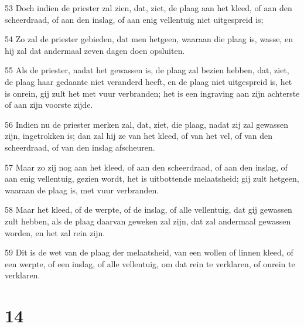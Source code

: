 \par 53 Doch indien de priester zal zien, dat, ziet, de plaag aan het kleed, of aan den scheerdraad, of aan den inslag, of aan enig vellentuig niet uitgespreid is;
\par 54 Zo zal de priester gebieden, dat men hetgeen, waaraan die plaag is, wasse, en hij zal dat andermaal zeven dagen doen opsluiten.
\par 55 Als de priester, nadat het gewassen is, de plaag zal bezien hebben, dat, ziet, de plaag haar gedaante niet veranderd heeft, en de plaag niet uitgespreid is, het is onrein, gij zult het met vuur verbranden; het is een ingraving aan zijn achterste of aan zijn voorste zijde.
\par 56 Indien nu de priester merken zal, dat, ziet, die plaag, nadat zij zal gewassen zijn, ingetrokken is; dan zal hij ze van het kleed, of van het vel, of van den scheerdraad, of van den inslag afscheuren.
\par 57 Maar zo zij nog aan het kleed, of aan den scheerdraad, of aan den inslag, of aan enig vellentuig, gezien wordt, het is uitbottende melaatsheid; gij zult hetgeen, waaraan de plaag is, met vuur verbranden.
\par 58 Maar het kleed, of de werpte, of de inslag, of alle vellentuig, dat gij gewassen zult hebben, als de plaag daarvan geweken zal zijn, dat zal andermaal gewassen worden, en het zal rein zijn.
\par 59 Dit is de wet van de plaag der melaatsheid, van een wollen of linnen kleed, of een werpte, of een inslag, of alle vellentuig, om dat rein te verklaren, of onrein te verklaren.

\chapter{14}


